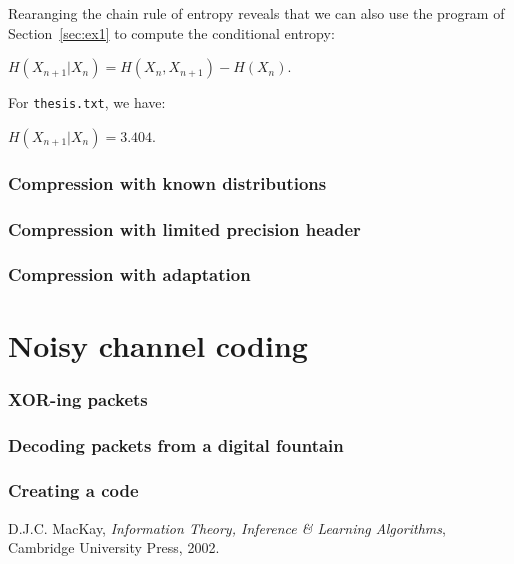 \documentclass[10pt,a4paper,twoside,twocolumn]{article}
\newcommand*{\thesisTXT}{{\tt thesis.txt}\xspace}
\begin{document}
Rearanging the chain rule of entropy \cite[p.~139]{mackay} reveals that we can
also use the program of Section~\ref{sec:ex1} to compute the conditional
entropy:

\begin{center}
    $H(X_{n+1} | X_n) = H(X_n, X_{n+1}) - H(X_n)$.
\end{center}

For \thesisTXT, we have:

\begin{center}
    $H(X_{n+1} | X_n) = 3.404$.
\end{center}


\section{Compression with known distributions}\label{sec:ex3}
\section{Compression with limited precision header}\label{sec:ex4}
\section{Compression with adaptation}\label{sec:ex5}


\part{Noisy channel coding}

\section{XOR-ing packets}\label{sec:ex6}
\section{Decoding packets from a digital fountain}\label{sec:ex7}
\section{Creating a code}\label{sec:ex8}


\begin{thebibliography}{9}

    D.J.C. MacKay,
    \emph{Information Theory, Inference \& Learning Algorithms},
    Cambridge University Press,
    2002.

\end{thebibliography}
\end{document}
